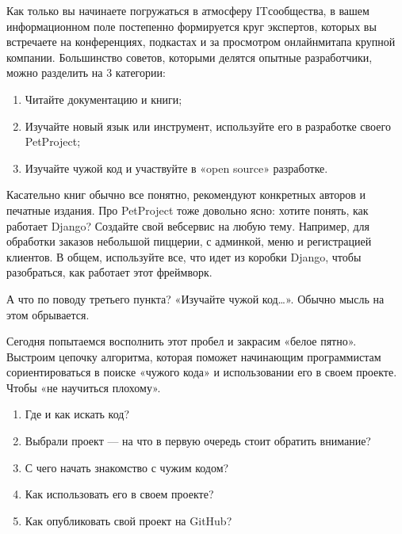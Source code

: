 \documentclass[letterpaper,10pt,russian]{sphinxmanual}
\begin{document}
\sphinxAtStartPar
{}

\sphinxAtStartPar
Как только вы начинаете погружаться в атмосферу IT\sphinxhyphen{}сообщества, в вашем информационном поле постепенно формируется круг экспертов, которых вы встречаете на конференциях, подкастах и за просмотром онлайн\sphinxhyphen{}митапа крупной компании. Большинство советов, которыми делятся опытные разработчики, можно разделить на 3 категории:
\begin{enumerate}
%
\item {} 
\sphinxAtStartPar
Читайте документацию и книги;

\item {} 
\sphinxAtStartPar
Изучайте новый язык или инструмент, используйте его в разработке своего PetProject;

\item {} 
\sphinxAtStartPar
Изучайте чужой код и участвуйте в «open source» разработке.

\end{enumerate}

\sphinxAtStartPar
Касательно книг обычно все понятно, рекомендуют конкретных авторов и печатные издания. Про PetProject тоже довольно ясно: хотите понять, как работает Django? Создайте свой веб\sphinxhyphen{}сервис на любую тему. Например, для обработки заказов небольшой пиццерии, с админкой, меню и регистрацией клиентов. В общем, используйте все, что идет из коробки Django, чтобы разобраться, как работает этот фреймворк.

\sphinxAtStartPar
А что по поводу третьего пункта? «Изучайте чужой код…». Обычно мысль на этом обрывается.

\sphinxAtStartPar
Сегодня попытаемся восполнить этот пробел и закрасим «белое пятно». Выстроим цепочку алгоритма, которая поможет начинающим программистам сориентироваться в поиске «чужого кода» и использовании его в своем проекте. Чтобы «не научиться плохому».
\begin{enumerate}
%
\item {} 
\sphinxAtStartPar
Где и как искать код?

\item {} 
\sphinxAtStartPar
Выбрали проект — на что в первую очередь стоит обратить внимание?

\item {} 
\sphinxAtStartPar
С чего начать знакомство с чужим кодом?

\item {} 
\sphinxAtStartPar
Как использовать его в своем проекте?

\item {} 
\sphinxAtStartPar
Как опубликовать свой проект на GitHub?

\end{enumerate}
\end{document}
